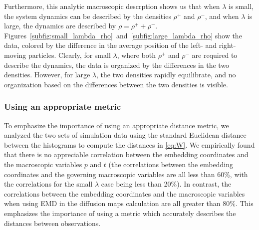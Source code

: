 \documentclass[preprint]{elsarticle}
\begin{document}
Furthermore, this analytic macroscopic descrption shows us that when $\lambda$ is small, the system dynamics can be described by the densities $\rho^+$ and $\rho^-$, and when $\lambda$ is large, the dynamics are described by $\rho = \rho^+ + \rho^-$. 
%
Figures~\ref{subfig:small_lambda_rho}~and~\ref{subfig:large_lambda_rho} show the data, colored by the difference in the average position of the left- and right-moving particles. 
%
Clearly, for small $\lambda$, where both $\rho^+$ and $\rho^-$ are required to describe the dynamics, the data is organized by the differences in the two densities. 
%
However, for large $\lambda$, the two densities rapidly equilibrate, and no organization based on the differences between the two densities is visible.  



%
%
%
%
%




\subsubsection{Using an appropriate metric}

To emphasize the importance of using an appropriate distance metric, we analyzed the two sets of simulation data using the standard Euclidean distance between the histograms to compute the distances in \eqref{eq:W}.
%
We empirically found that there is no appreciable correlation between the embedding coordinates and the macroscopic variables $p$ and $t$ (the correlations between the embedding coordinates and the governing macroscopic variables are all  less than 60\%, with the correlations for the small $\lambda$ case being less than 20\%). 
%
In contrast, the correlations between the embedding coordinates and the macroscopic variables when using EMD in the diffusion maps calculation are all greater than 80\%.
%
This emphasizes the importance of using a metric which accurately describes the distances between observations.
\end{document}
